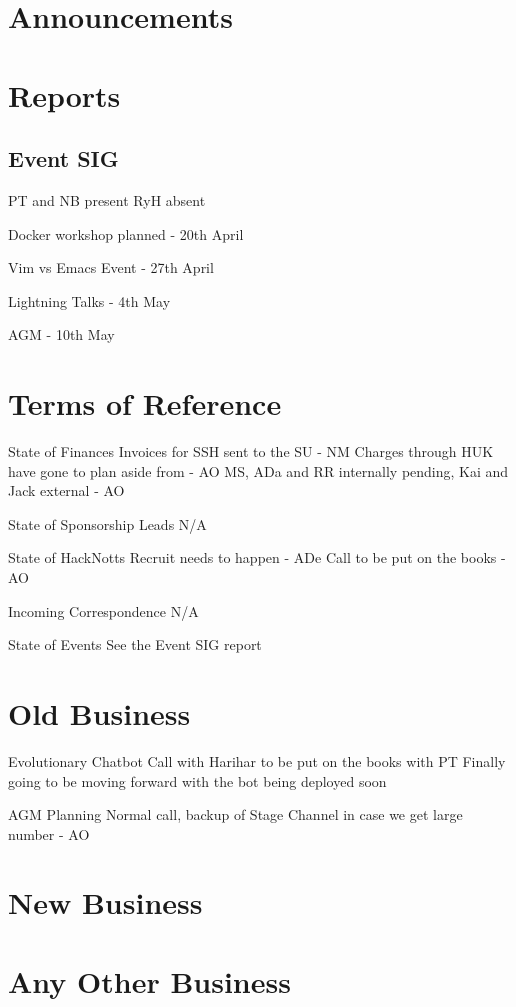 \documentclass[11pt,hacksoc]{meetingmins}
\begin{document}
\maketitle

\section{Announcements}

\section{Reports}
\subsection{Event SIG}
\begin{items}
\item PT and NB present RyH absent 
\item Docker workshop planned - 20th April
\item Vim vs Emacs Event - 27th April
\item Lightning Talks - 4th May
\item AGM - 10th May
\end{items}

\section{Terms of Reference}
\begin{items}
\item {State of Finances}
\subitem Invoices for SSH sent to the SU - NM
\subitem Charges through HUK have gone to plan aside from - AO
\subsubitem MS, ADa and RR internally pending, Kai and Jack external - AO
\item {State of Sponsorship Leads}
\subitem N/A
\item {State of HackNotts}
\subitem Recruit needs to happen - ADe
\subitem Call to be put on the books - AO
\item {Incoming Correspondence}
\subitem N/A
\item {State of Events}
\subitem See the Event SIG report
\end{items}

\section{Old Business}
\begin{items}
\item Evolutionary Chatbot
\subitem Call with Harihar to be put on the books with PT
\subitem Finally going to be moving forward with the bot being deployed soon
\item AGM Planning
\subitem Normal call, backup of Stage Channel in case we get large number - AO
\end{items}

\section{New Business}

\section{Any Other Business}

\vspace{1em}
\nextmeeting{}
\end{document}
